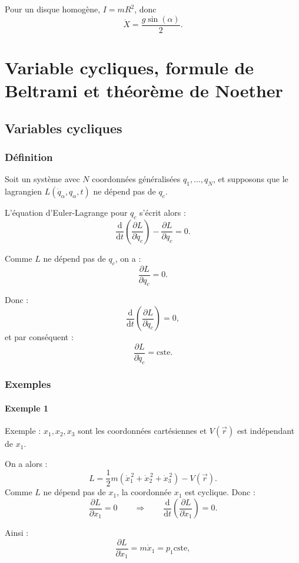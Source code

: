 \documentclass[french]{yLectureNote}
\renewcommand{\vec}{\overrightarrow}
\newcommand{\dd}{\mathrm{d}}
\begin{document}
Pour un disque homogène, $I=mR^2$, donc
\[
\ddot{X}=\frac{g\sin(\alpha)}{2}.
\]
\chapter{Variable cycliques, formule de Beltrami et théorème de Noether}
\section{Variables cycliques}
\subsection{Définition}
Soit un système avec $N$ coordonnées généralisées $q_1,\dots,q_N$, et supposons que le lagrangien
$L(\dot{q}_\alpha,q_\alpha,t)$ ne dépend pas de $q_c$.

L'équation d'Euler-Lagrange pour $q_c$ s'écrit alors :
\[
\frac{\dd}{\dd t}\left(\frac{\partial L}{\partial \dot{q}_c}\right)
-
\frac{\partial L}{\partial q_c}
= 0.
\]

Comme $L$ ne dépend pas de $q_c$, on a :
\[
\frac{\partial L}{\partial q_c}=0.
\]

Donc :
\[
\frac{\dd}{\dd t}\left(\frac{\partial L}{\partial \dot{q}_c}\right)=0,
\]
et par conséquent :
\[
\frac{\partial L}{\partial \dot{q}_c}=\text{cste}.
\]
\subsection{Exemples}
\subsubsection{Exemple 1}
Exemple : $x_1, x_2, x_3$ sont les coordonnées cartésiennes et $V(\vec{r})$ est indépendant de $x_1$.

On a alors :
\[
L=\frac{1}{2}m\left(\dot{x}_1^{\,2}+\dot{x}_2^{\,2}+\dot{x}_3^{\,2}\right)-V(\vec{r}).
\]
Comme $L$ ne dépend pas de $x_1$, la coordonnée $x_1$ est cyclique. Donc :
\[
\frac{\partial L}{\partial x_1}=0
\qquad \Rightarrow \qquad
\frac{\dd}{\dd t}\left(\frac{\partial L}{\partial \dot{x}_1}\right)=0.
\]

Ainsi :
\[
\frac{\partial L}{\partial \dot{x}_1}=m\dot{x}_1= p_1\text{cste},
\]
\end{document}
